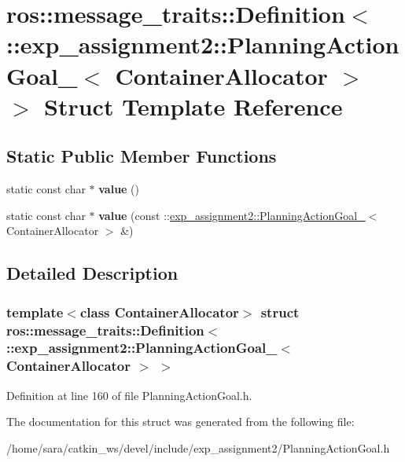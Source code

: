 \hypertarget{structros_1_1message__traits_1_1Definition_3_01_1_1exp__assignment2_1_1PlanningActionGoal___3_01ContainerAllocator_01_4_01_4}{}\section{ros\+:\+:message\+\_\+traits\+:\+:Definition$<$ \+:\+:exp\+\_\+assignment2\+:\+:Planning\+Action\+Goal\+\_\+$<$ Container\+Allocator $>$ $>$ Struct Template Reference}
\label{structros_1_1message__traits_1_1Definition_3_01_1_1exp__assignment2_1_1PlanningActionGoal___3_01ContainerAllocator_01_4_01_4}
\subsection*{Static Public Member Functions}
\begin{DoxyCompactItemize}
\item 
\mbox{\label{structros_1_1message__traits_1_1Definition_3_01_1_1exp__assignment2_1_1PlanningActionGoal___3_01ContainerAllocator_01_4_01_4_ac8dc42b76622cd6f7e5444542daae847}} 
static const char $\ast$ {\bfseries value} ()
\item 
\mbox{\label{structros_1_1message__traits_1_1Definition_3_01_1_1exp__assignment2_1_1PlanningActionGoal___3_01ContainerAllocator_01_4_01_4_a9429c9b8494ffc5e54c0d7838905a345}} 
static const char $\ast$ {\bfseries value} (const \+::\hyperlink{structexp__assignment2_1_1PlanningActionGoal__}{exp\+\_\+assignment2\+::\+Planning\+Action\+Goal\+\_\+}$<$ Container\+Allocator $>$ \&)
\end{DoxyCompactItemize}


\subsection{Detailed Description}
\subsubsection*{template$<$class Container\+Allocator$>$\newline
struct ros\+::message\+\_\+traits\+::\+Definition$<$ \+::exp\+\_\+assignment2\+::\+Planning\+Action\+Goal\+\_\+$<$ Container\+Allocator $>$ $>$}



Definition at line 160 of file Planning\+Action\+Goal.\+h.



The documentation for this struct was generated from the following file\+:\begin{DoxyCompactItemize}
\item 
/home/sara/catkin\+\_\+ws/devel/include/exp\+\_\+assignment2/Planning\+Action\+Goal.\+h\end{DoxyCompactItemize}
